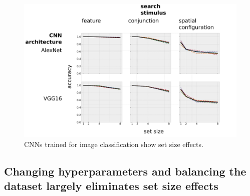 \documentclass[10pt,letterpaper]{article}
\begin{document}
\begin{figure}[ht]
\begin{center}
\includegraphics[width=\columnwidth]{fig2/fig2.png}
\end{center}
\caption{CNNs trained for image classification show set size effects.} 
\label{sample-figure}
\end{figure}


\subsection{Changing hyperparameters and balancing the dataset largely 
eliminates set size effects}
\end{document}
